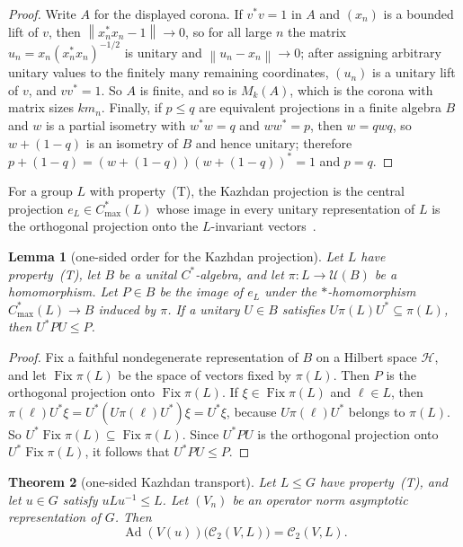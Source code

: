 \documentclass[11pt]{amsart}
\newcommand{\leanverified}[2]{\ignorespaces}
\newtheorem{theorem}{Theorem}[section]
\newtheorem{lemma}[theorem]{Lemma}
\theoremstyle{plain}
\newcommand{\U}{\mathcal U}
\newcommand{\opnorm}[1]{\left\lVert #1\right\rVert}
\begin{document}
\begin{proof}
Write $A$ for the displayed corona.  If $v^*v=1$ in $A$ and $(x_n)$ is a
bounded lift of $v$, then $\opnorm{x_n^*x_n-1}\to0$, so for all large $n$
the matrix $u_n=x_n(x_n^*x_n)^{-1/2}$ is unitary and $\opnorm{u_n-x_n}\to0$;
after assigning arbitrary unitary values to the finitely many remaining
coordinates, $(u_n)$ is a unitary lift of $v$, and $vv^*=1$.  So $A$ is
finite, and so is $M_k(A)$, which is the corona with matrix sizes $km_n$.
Finally, if $p\le q$ are equivalent projections in a finite algebra
$B$ and $w$ is a partial isometry with $w^*w=q$ and $ww^*=p$, then
$w=qwq$, so $w+(1-q)$ is an isometry of $B$ and hence unitary; therefore
$p+(1-q)=(w+(1-q))(w+(1-q))^*=1$ and $p=q$.
\end{proof}

For a group $L$ with property~\textup{(T)}, the Kazhdan projection is the
central projection $e_L\in C^*_{\max}(L)$ whose image in every unitary
representation of $L$ is the orthogonal projection onto the
$L$-invariant vectors~\cite{AkemannWalter}.

\begin{lemma}[one-sided order for the Kazhdan projection]
\label{lem:kazhdan-projection-order}
Let $L$ have property~\textup{(T)}, let $B$ be a unital $C^*$-algebra, and
let $\pi\colon L\to\U(B)$ be a homomorphism.  Let $P\in B$ be the image
of $e_L$ under the $*$-homomorphism $C^*_{\max}(L)\to B$ induced by
$\pi$.  If a unitary $U\in B$ satisfies $U\pi(L)U^*\subseteq\pi(L)$, then
$U^*PU\le P$.
\leanverified{Manuscript/OneSidedMFRadical/KazhdanProjectionOrderLiteral}{GroupApproximation.Manuscript.OneSidedMFRadical.manuscriptLiteralMaximalCStarKazhdanProjectionOrder}
\end{lemma}

\begin{proof}
Fix a faithful nondegenerate representation of $B$ on a Hilbert space
$\mathcal H$, and let $\operatorname{Fix}\pi(L)$ be the space of vectors
fixed by $\pi(L)$.  Then $P$ is the orthogonal projection onto
$\operatorname{Fix}\pi(L)$.  If $\xi\in\operatorname{Fix}\pi(L)$ and
$\ell\in L$, then $\pi(\ell)U^*\xi=U^*(U\pi(\ell)U^*)\xi=U^*\xi$, because
$U\pi(\ell)U^*$ belongs to $\pi(L)$.  So
$U^*\operatorname{Fix}\pi(L)\subseteq\operatorname{Fix}\pi(L)$.  Since
$U^*PU$ is the orthogonal projection onto $U^*\operatorname{Fix}\pi(L)$,
it follows that $U^*PU\le P$.
\end{proof}

\begin{theorem}[one-sided Kazhdan transport]\label{thm:transport}
Let $L\le G$ have property~\textup{(T)}, and let $u\in G$ satisfy
$uLu^{-1}\le L$.  Let $(V_n)$ be an operator norm asymptotic
representation of $G$.  Then
\[
 \operatorname{Ad}(V(u))\bigl(\mathcal C_2(V,L)\bigr)
 =\mathcal C_2(V,L).
\]
\leanverified{Manuscript/OneSidedMFRadical/TransportCommutantEquality}{GroupApproximation.Manuscript.OneSidedMFRadical.manuscriptOneSidedKazhdanTransportCommutantEquality}
\end{theorem}
\end{document}
